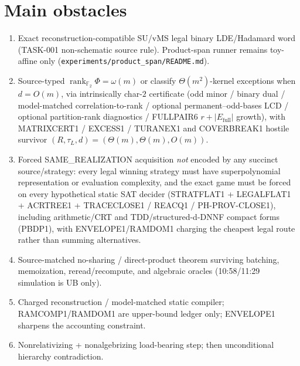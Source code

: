 \documentclass[11pt]{article}
\begin{document}
\section*{Main obstacles}
\begin{enumerate}
\item Exact reconstruction-compatible SU/vMS legal binary LDE/Hadamard word
(TASK-001 non-schematic source rule). Product-span runner remains toy-affine only
(\texttt{experiments/product\_span/README.md}).
\item Source-typed $\operatorname{rank}_{\mathbb F_2}\Phi=\omega(m)$ or classify
$\Theta(m^2)$-kernel exceptions when $d=O(m)$, via intrinsically char-$2$
certificate (odd minor / binary dual / model-matched correlation-to-rank /
optional permanent--odd-bases LCD / optional partition-rank diagnostics /
FULLPAIR6 $r+|E_{\mathrm{full}}|$ growth), with MATRIXCERT1 / EXCESS1 / TURANEX1
and COVERBREAK1 hostile survivor $(R,\tau_L,d)=(\Theta(m),\Theta(m),O(m))$.
\item Forced SAME\_REALIZATION acquisition \emph{not} encoded by any succinct
source/strategy: every legal winning strategy must have superpolynomial
representation or evaluation complexity, and the exact game must be forced on
every hypothetical static SAT decider (STRATFLAT1 + LEGALFLAT1 + ACRTREE1 +
TRACECLOSE1 / REACQ1 / PH-PROV-CLOSE1), including arithmetic/CRT and
TDD/structured-d-DNNF compact forms (PBDP1), with ENVELOPE1/RAMDOM1 charging the
cheapest legal route rather than summing alternatives.
\item Source-matched no-sharing / direct-product theorem surviving batching,
memoization, reread/recompute, and algebraic oracles (10:58/11:29 simulation is
UB only).
\item Charged reconstruction / model-matched static compiler; RAMCOMP1/RAMDOM1 are
upper-bound ledger only; ENVELOPE1 sharpens the accounting constraint.
\item Nonrelativizing + nonalgebrizing load-bearing step; then unconditional
hierarchy contradiction.
\end{enumerate}
\end{document}

